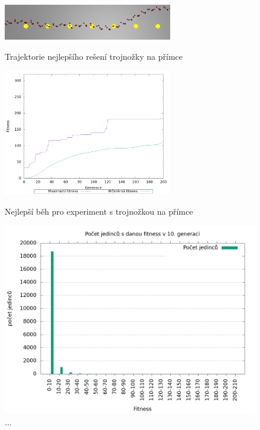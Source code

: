 \begin{figure}[h]
    \centering
    {\includegraphics[width=20em]{obrazky/trojnozka_primka_zhora_nejlepsi_reseni_trajektorie.png}}
    \caption{
    Trajektorie nejlepšího rešení trojnožky na přímce
    }
    \label{fig:trojnozka_primka_zhora_nejlepsi_reseni_trajektorie}
\end{figure}



\begin{figure}[h]
    \begin{minipage}[c]{0.48\linewidth}
    {\includegraphics[width=20em]{obrazky/trojnozka_primka_fitness_prubeh.png}}
        \caption{
        Nejlepší běh pro experiment s trojnožkou na přímce
        }
    \end{minipage}
    \hfill
    \begin{minipage}[c]{0.48\linewidth}
        \includegraphics[width=\linewidth]{obrazky/trojnozka_primka_fitnessHistogram10.png}
        \caption{...}
    \end{minipage}
\end{figure}

